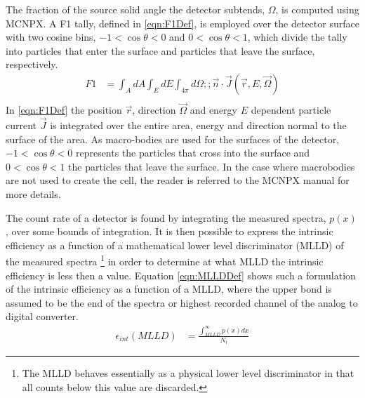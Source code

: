 The fraction of the source solid angle the detector subtends, $\Omega$, is computed using MCNPX. 
A F1 tally, defined in \eqref{eqn:F1Def}, is employed over the detector surface with two cosine bins, $-1<\cos\theta<0$ and $0<\cos\theta<1$, which divide the tally into particles that enter the surface and particles that leave the surface, respectively.
\begin{align}
  \label{eqn:F1Def}
  F1 &= \int_A dA \int_E dE \int_{4\pi} d\Omega ;;\vec{n}\cdot\vec{J}(\vec{r},E,\vec{\Omega}) \\
\end{align}
In \eqref{eqn:F1Def} the position $\vec{r}$, direction $\vec{\Omega}$ and energy $E$  dependent particle current $\vec{J}$  is integrated over the entire area, energy and direction normal to the surface of the area.
As macro-bodies are used for the surfaces of the detector, $-1<\cos\theta<0$ represents the particles that cross into the surface and $0<\cos\theta<1$ the particles that leave the surface.
In the case where macrobodies are not used to create the cell, the reader is referred to the MCNPX manual for more details.

The count rate of a detector is found by integrating the measured spectra, $p(x)$,  over some bounds of integration.
It is then possible to express the intrinsic efficiency as a function of a mathematical lower level discriminator (MLLD) of the measured spectra \footnote{The MLLD behaves essentially as a physical lower level discriminator in that all counts below this value are discarded.} in order to determine at what MLLD the intrinsic efficiency is less then a value.
Equation \eqref{eqn:MLLDDef} shows such a formulation of the intrinsic efficiency as a function of a MLLD, where the upper bond is assumed to be the end of the spectra or highest recorded channel of the analog to digital converter.
\begin{align}
	\label{eqn:MLLDDef}
	\epsilon_{int}(MLLD) &= \frac{\int_{MLLD}^\infty p(x)dx}{N_i}
\end{align}

